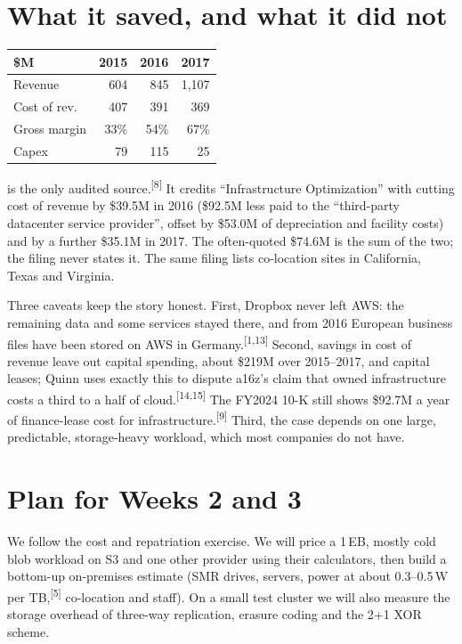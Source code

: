 \documentclass[a4paper,justified,nobib]{tufte-handout}
\DeclareRobustCommand{\cite}[1]{\textsuperscript{[#1]}}
\begin{document}
\section{What it saved, and what it did not}

\begin{margintable}
\centering
\footnotesize
\begin{tabular}{@{}lrrr@{}}
\toprule
\$M & 2015 & 2016 & 2017 \\
\midrule
Revenue & 604 & 845 & 1{,}107 \\
Cost of rev. & 407 & 391 & 369 \\
Gross margin & 33\% & 54\% & 67\% \\
Capex & 79 & 115 & 25 \\
\bottomrule
\end{tabular}
\caption{From Dropbox's S-1.\cite{8} Revenue nearly doubled while cost of revenue fell.}
\end{margintable}

 is the only audited source.\cite{8} It credits ``Infrastructure
Optimization'' with cutting cost of revenue by \$39.5M in 2016 (\$92.5M less paid to the
``third-party datacenter service provider'', offset by \$53.0M of depreciation and facility
costs) and by a further \$35.1M in 2017. The often-quoted \$74.6M is the sum of the two; the
filing never states it. The same filing lists co-location sites in California, Texas and
Virginia.

Three caveats keep the story honest. First, Dropbox never left AWS: the remaining data and
some services stayed there, and from 2016 European business files have been stored on AWS in
Germany.\cite{1,13} Second, savings in cost of revenue leave out capital spending, about
\$219M over 2015--2017, and capital leases; Quinn uses exactly this to dispute a16z's claim
that owned infrastructure costs a third to a half of cloud.\cite{14,15} The FY2024 10-K still
shows \$92.7M a year of finance-lease cost for infrastructure.\cite{9} Third, the case
depends on one large, predictable, storage-heavy workload, which most companies do not have.

\section{Plan for Weeks 2 and 3}

We follow the cost and repatriation exercise. We will price a 1\,EB, mostly cold blob
workload on S3 and one other provider using their calculators, then build a bottom-up
on-premises estimate (SMR drives, servers, power at about 0.3--0.5\,W per TB,\cite{5}
co-location and staff). On a small test cluster we will also measure the storage overhead of
three-way replication, erasure coding and the 2+1 XOR scheme.
\end{document}
